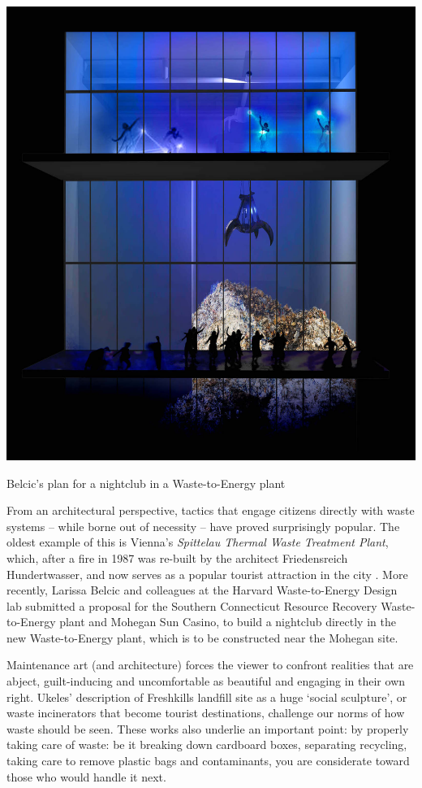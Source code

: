 \documentclass[nofonts,nols,justified,nobib]{tufte-book}
\begin{document}
\begin{marginfigure}
\includegraphics[width=\textwidth]{img/1/belcic-wasted.jpg}
\caption{Belcic's plan for a nightclub in a Waste-to-Energy plant}
\end{marginfigure}


From an architectural perspective, tactics that engage citizens directly with waste systems -- while borne out of necessity -- have proved surprisingly popular. The oldest example of this is Vienna's \emph{Spittelau Thermal Waste Treatment Plant}, which, after a fire in 1987 was re-built by the architect Friedensreich Hundertwasser, and now serves as a popular tourist attraction in the city \cite{noauthor_wien_nodate}. More recently, Larissa Belcic and colleagues at the Harvard Waste-to-Energy Design lab submitted a proposal for the Southern Connecticut Resource Recovery Waste-to-Energy plant and Mohegan Sun Casino, to build a nightclub directly in the new Waste-to-Energy plant, which is to be constructed near the Mohegan site. \cite{belcic_wasted_2015}

Maintenance art (and architecture) forces the viewer to confront realities that are abject, guilt-inducing and uncomfortable as beautiful and engaging in their own right. Ukeles' description of  Freshkills landfill site as a huge `social sculpture', or waste incinerators that become tourist destinations, challenge our norms of how waste should be seen\cite{cotter_artist_2017}. These works also underlie an important point: by properly taking care of waste: be it breaking down cardboard boxes, separating recycling, taking care to remove plastic bags and contaminants, you are considerate toward those who would handle it next.
\end{document}
